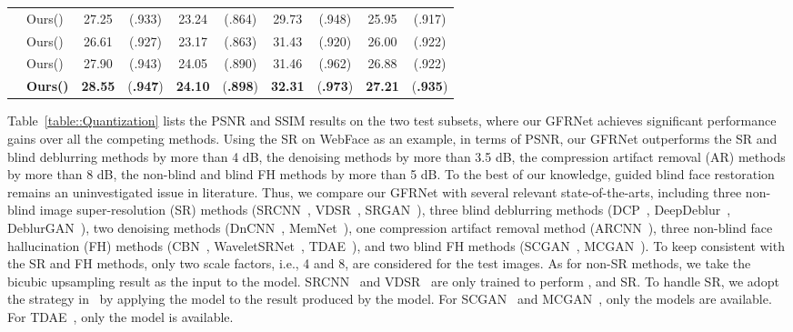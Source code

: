 \documentclass[runningheads]{llncs}
\begin{document}
\begin{table*}[t]
{\begin{center}
\begin{tabular}{ c| l|c c c  c|c c c c}
				&Ours() & 27.25 & (.933) & 23.24 & (.864) & 29.73 & (.948)& 25.95 & (.917) \\
				&Ours()& 26.61 & (.927) & 23.17 & (.863) & 31.43 & (.920) & 26.00 & (.922)\\
				&Ours()& 27.90 & (.943) & 24.05 & (.890) & 31.46 & (.962) & 26.88 & (.922)\\
				&{\bf Ours()}& {\bf \color{red}28.55} & ({\bf \color{red}.947}) & {\bf \color{red}24.10} & ({\bf \color{red}.898})& {\bf \color{red}32.31} & ({\bf \color{red}.973}) & {\bf \color{red}27.21} & ({\bf \color{red}.935})\\
				\hline
			\end{tabular}\end{center}
	}
\end{table*}
Table~\ref{table::Quantization} lists the PSNR and SSIM results on the two test subsets, where our GFRNet achieves significant performance gains over all the competing methods.
Using the  SR on WebFace as an example, in terms of PSNR, our GFRNet outperforms the {SR} and blind deblurring methods by more than 4 dB, the denoising methods by more than 3.5 dB, the {compression artifact removal (AR)} methods by more than 8 dB, the non-blind and blind {FH} methods by more than 5 dB.
To the best of our knowledge, guided blind face restoration remains an uninvestigated issue in literature.
Thus, we compare our GFRNet with several relevant state-of-the-arts, including three non-blind image super-resolution (SR) methods (SRCNN~\cite{dong2014learning}, VDSR~\cite{kim2016accurate}, SRGAN~\cite{Ledig2017CVPR}), three blind deblurring methods (DCP~\cite{pan2016blind}, DeepDeblur~\cite{Nah2017CVPR}, DeblurGAN~\cite{DeblurGAN}), two denoising methods (DnCNN~\cite{zhang2017beyond}, MemNet~\cite{MemNet}), one compression artifact removal method (ARCNN~\cite{Dong2015ICCV}), three non-blind face hallucination (FH) methods (CBN~\cite{zhu2016deep}, WaveletSRNet~\cite{huang2017wavelet}, TDAE~\cite{yu2017hallucinating}),
and two blind FH methods (SCGAN~\cite{xu2017learning}, MCGAN~\cite{xu2017learning}).
To keep consistent with the SR and FH methods, only two scale factors, i.e., 4 and 8, are considered for the test images.
As for non-SR methods, we take the bicubic upsampling result as the input to the model.
SRCNN~\cite{dong2014learning} and VDSR~\cite{kim2016accurate} are only trained to perform ,  and  SR.
To handle  SR, we adopt the strategy in~\cite{tuzel2016global} by applying the  model to the result produced by the  model.
For SCGAN~\cite{xu2017learning} and MCGAN~\cite{xu2017learning}, only the  models are available. For TDAE~\cite{yu2017hallucinating}, only the  model is available.
\end{document}

